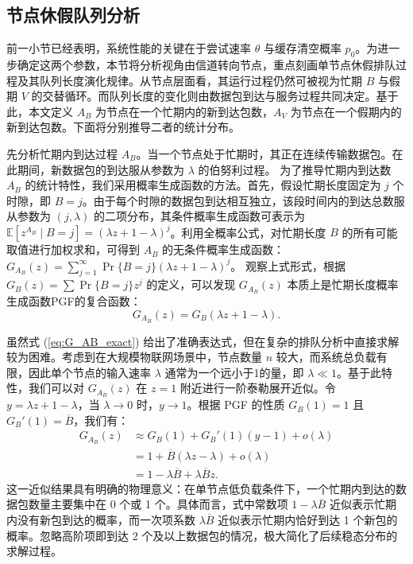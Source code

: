 \subsection{节点休假队列分析}

\label{subsec:node_vacation_analysis}

前一小节已经表明，系统性能的关键在于尝试速率 $\theta$ 与缓存清空概率 $p_0$。为进一步确定这两个参数，本节将分析视角由信道转向节点，重点刻画单节点休假排队过程及其队列长度演化规律。从节点层面看，其运行过程仍然可被视为忙期 $B$ 与假期 $V$ 的交替循环。而队列长度的变化则由数据包到达与服务过程共同决定。基于此，本文定义 $A_B$ 为节点在一个忙期内的新到达包数，$A_V$ 为节点在一个假期内的新到达包数。下面将分别推导二者的统计分布。

先分析忙期内到达过程 $A_B$。当一个节点处于忙期时，其正在连续传输数据包。在此期间，新数据包的到达服从参数为 $\lambda$ 的伯努利过程。
为了推导忙期内到达数 $A_B$ 的统计特性，我们采用概率生成函数的方法。首先，假设忙期长度固定为 $j$ 个时隙，即 $B=j$。由于每个时隙的数据包到达相互独立，该段时间内的到达总数服从参数为 $(j, \lambda)$ 的二项分布，其条件概率生成函数可表示为 $ \mathbb{E}[z^{A_B} \mid B=j] = (\lambda z + 1 - \lambda)^j $。利用全概率公式，对忙期长度 $B$ 的所有可能取值进行加权求和，可得到 $A_B$ 的无条件概率生成函数：
	$ G_{A_B}(z) = \sum_{j=1}^{\infty} \Pr \{B = j\} (\lambda z + 1 - \lambda)^j $。
观察上式形式，根据 $G_B(z) = \sum \Pr\{B=j\} z^j$ 的定义，可以发现 $G_{A_B}(z)$ 本质上是忙期长度概率生成函数PGF的复合函数：
\begin{equation}
	\label{eq:G_AB_exact}
	G_{A_B}(z) = G_B(\lambda z + 1 - \lambda).
\end{equation}

虽然式 (\ref{eq:G_AB_exact}) 给出了准确表达式，但在复杂的排队分析中直接求解较为困难。考虑到在大规模物联网场景中，节点数量 $n$ 较大，而系统总负载有限，因此单个节点的输入速率 $\lambda$ 通常为一个远小于1的量，即 $\lambda \ll 1$。基于此特性，我们可以对 $G_{A_B}(z)$ 在 $z=1$ 附近进行一阶泰勒展开近似。令 $y = \lambda z + 1 - \lambda$，当 $\lambda \to 0$ 时，$y \to 1$。根据 PGF 的性质 $G_B(1)=1$ 且 $G_B'(1)=\overline{B}$，我们有：
\begin{equation}
	\begin{aligned}
		G_{A_B}(z) & \approx G_B(1) + G_B'(1)(y - 1) + o(\lambda) \\
		& = 1 + \overline{B} (\lambda z - \lambda) + o(\lambda) \\
		& = 1 - \lambda \overline{B} + \lambda \overline{B} z.
	\end{aligned}
	\label{eq:G_AB_approx}
\end{equation}
这一近似结果具有明确的物理意义：在单节点低负载条件下，一个忙期内到达的数据包数量主要集中在 0 个或 1 个。具体而言，式中常数项 $1 - \lambda \overline{B}$ 近似表示忙期内没有新包到达的概率，而一次项系数 $\lambda \overline{B}$ 近似表示忙期内恰好到达 1 个新包的概率。忽略高阶项即到达 2 个及以上数据包的情况，极大简化了后续稳态分布的求解过程。


